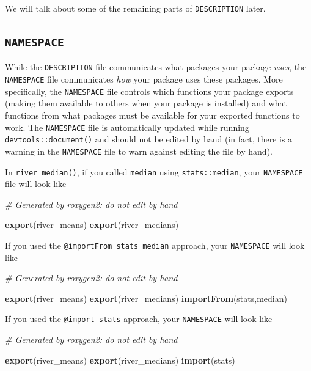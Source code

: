 \documentclass[
]{book}
\newenvironment{Shaded}{\begin{snugshade}}{\end{snugshade}}
\newcommand{\CommentTok}[1]{\textcolor[rgb]{0.56,0.35,0.01}{\textit{#1}}}
\newcommand{\KeywordTok}[1]{\textcolor[rgb]{0.13,0.29,0.53}{\textbf{#1}}}
\newcommand{\NormalTok}[1]{#1}
\begin{document}
We will talk about some of the remaining parts of \texttt{DESCRIPTION} later.

\hypertarget{namespace}{%
\subsection{\texorpdfstring{\texttt{NAMESPACE}}{NAMESPACE}}\label{namespace}}

While the \texttt{DESCRIPTION} file communicates what packages your package \emph{uses}, the \texttt{NAMESPACE} file communicates \emph{how} your package uses these packages. More specifically, the \texttt{NAMESPACE} file controls which functions your package exports (making them available to others when your package is installed) and what functions from what packages must be available for your exported functions to work. The \texttt{NAMESPACE} file is automatically updated while running \texttt{devtools::document()} and should not be edited by hand (in fact, there is a warning in the \texttt{NAMESPACE} file to warn against editing the file by hand).

In \texttt{river\_median()}, if you called \texttt{median} using \texttt{stats::median}, your \texttt{NAMESPACE} file will look like

\begin{Shaded}
\begin{Highlighting}[]
\CommentTok{# Generated by roxygen2: do not edit by hand}

\KeywordTok{export}\NormalTok{(river_means)}
\KeywordTok{export}\NormalTok{(river_medians)}
\end{Highlighting}
\end{Shaded}

If you used the \texttt{@importFrom\ stats\ median} approach, your \texttt{NAMESPACE} will look like

\begin{Shaded}
\begin{Highlighting}[]
\CommentTok{# Generated by roxygen2: do not edit by hand}

\KeywordTok{export}\NormalTok{(river_means)}
\KeywordTok{export}\NormalTok{(river_medians)}
\KeywordTok{importFrom}\NormalTok{(stats,median)}
\end{Highlighting}
\end{Shaded}

If you used the \texttt{@import\ stats} approach, your \texttt{NAMESPACE} will look like

\begin{Shaded}
\begin{Highlighting}[]
\CommentTok{# Generated by roxygen2: do not edit by hand}

\KeywordTok{export}\NormalTok{(river_means)}
\KeywordTok{export}\NormalTok{(river_medians)}
\KeywordTok{import}\NormalTok{(stats)}
\end{Highlighting}
\end{Shaded}
\end{document}
